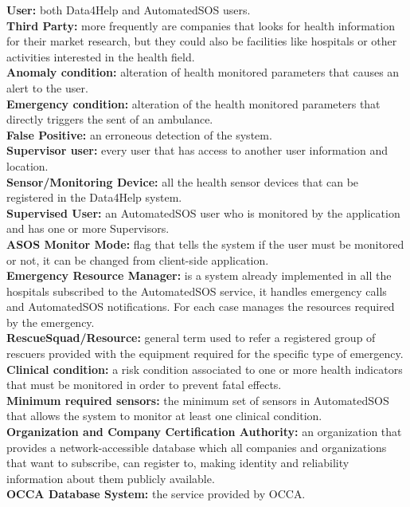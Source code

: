 \begin{flushleft}
{}
{}
\raggedright
\textbf{User:} both Data4Help and AutomatedSOS users.\\
\textbf{Third Party:} more frequently are companies that looks for health information for their market research, but they could also be facilities like hospitals or other activities interested in the health field.  \\ 
\textbf{Anomaly condition:} alteration of health monitored parameters that causes an alert to the user.\\
\textbf{Emergency condition:} alteration of the health monitored parameters that directly triggers the sent of an ambulance.\\
\textbf{False Positive:} an erroneous detection of the system.\\
\textbf{Supervisor user:} every user that has access to another user information and location. \\
\textbf{Sensor/Monitoring Device:} all the health sensor devices that can be registered in the Data4Help system.\\
\textbf{Supervised User:} an AutomatedSOS user who is monitored by the application and has one or more Supervisors. \\
\textbf{ASOS Monitor Mode:} flag that tells the system if the user must be monitored or not, it can be changed from client-side application.\\
\textbf{Emergency Resource Manager:} is a system already implemented in all the hospitals subscribed to the AutomatedSOS service, it handles emergency calls and AutomatedSOS notifications. For each case manages the resources required by the emergency. \\
\textbf{RescueSquad/Resource:} general term used to refer a registered group of rescuers provided with the equipment required for the specific type of emergency. \\
\textbf{Clinical condition:} a risk condition associated to one or more health indicators that must be monitored in order to prevent fatal effects. \\
\textbf{Minimum required sensors:} the minimum set of sensors in AutomatedSOS that allows the system to monitor at least one clinical condition. \\
\textbf{Organization and Company Certification Authority:} an organization that provides a network-accessible database which all companies and organizations that want to subscribe, can register to, making identity and reliability information about them publicly available.\\
\textbf{OCCA Database System:} the service provided by OCCA.\\

\end{flushleft}

